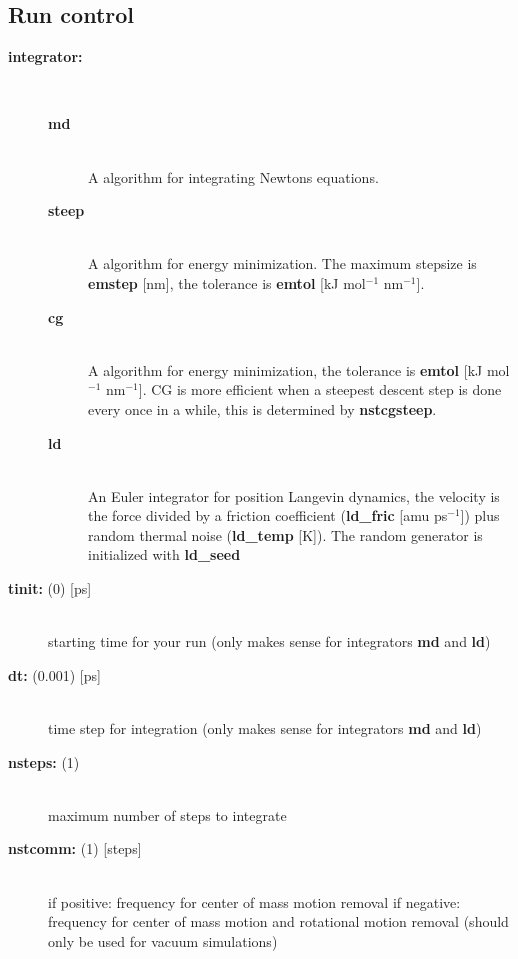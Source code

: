 \subsection{Run control}
\begin{description}
\item[{\bf integrator:}]\mbox{}\\
\vspace{-2ex}\begin{description}
\item[{\bf md} ]\mbox{}\\
A  algorithm for integrating Newtons
equations.
\item[{\bf steep}]\mbox{}\\
A  algorithm for energy
minimization. The maximum stepsize is {\bf emstep}
[nm], the tolerance is {\bf emtol} [kJ
mol$^{-1}$ nm$^{-1}$].
\item[{\bf cg}]\mbox{}\\
 A  algorithm for energy
minimization, the tolerance is {\bf emtol} [kJ mol$^{-1}$
nm$^{-1}$].  CG is more efficient when a steepest descent step
is done every once in a while, this is determined by 
{\bf nstcgsteep}.
\item[{\bf ld}]\mbox{}\\
 An Euler integrator for position Langevin dynamics, the
velocity is the force divided by a friction coefficient 
({\bf ld\_fric} [amu ps$^{-1}$])
plus random thermal noise ({\bf ld\_temp} [K]). 
The random generator is initialized with {\bf ld\_seed}
\end{description}
\item[{\bf tinit: }(0) {[ps]}]\mbox{}\\
starting time for your run (only makes sense for integrators {\bf md} 
and {\bf ld})
\item[{\bf dt: }(0.001) {[ps]}]\mbox{}\\
time step for integration (only makes sense for integrators {\bf md} 
and {\bf ld})
\item[{\bf nsteps: }(1)]\mbox{}\\
maximum number of steps to integrate
\item[{\bf nstcomm: }(1) {[steps]}]\mbox{}\\
if positive: frequency for center of mass motion removal
if negative: frequency for center of mass motion and rotational 
motion removal (should only be used for vacuum simulations)
\end{description}

